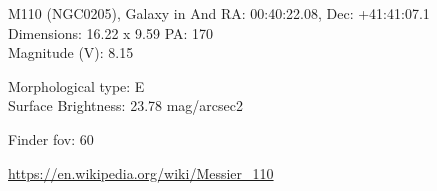\begin{block}{M110 (NGC0205), Galaxy in And}
    RA: 00:40:22.08, Dec: +41:41:07.1 \\ 
    Dimensions: 16.22 x 9.59 PA: 170 \\ 
    Magnitude (V): 8.15

    Morphological type: E \\ 
    Surface Brightness: 23.78 mag/arcsec2 


    Finder fov: 60 

    \url{https://en.wikipedia.org/wiki/Messier_110} 
\end{block}